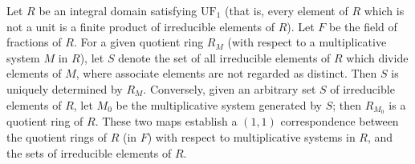 Let $R$ be an integral domain satisfying $\mathrm{UF}_1$ (that is, every element of $R$ which is not a unit is a finite product of irreducible elements of $R$). Let $F$ be the field of fractions of $R$. For a given quotient ring $R_M$ (with respect to a multiplicative system $M$ in $R$), let $S$ denote the set of all irreducible elements of $R$ which divide elements of $M$, where associate elements are not regarded as distinct. Then $S$ is uniquely determined by $R_M$. Conversely, given an arbitrary set $S$ of irreducible elements of $R$, let $M_0$ be the multiplicative system generated by $S$; then $R_{M_0}$ is a quotient ring of $R$. These two maps establish a $(1,1)$ correspondence between the quotient rings of $R$ (in $F$) with respect to multiplicative systems in $R$, and the sets of irreducible elements of $R$.
